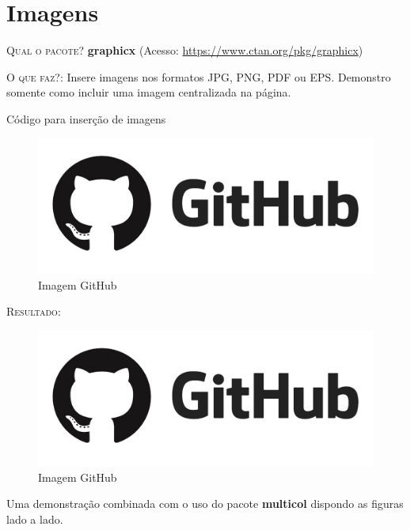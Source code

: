 \documentclass[a4paper,12pt,oneside,openright,extrafontsizes,openbib]{memoir}
\begin{document}
{%
\chapter{Imagens}

\textsc{Qual o pacote?} \textbf{graphicx} (Acesso: \url{https://www.ctan.org/pkg/graphicx})

\textsc{O que faz?}: Insere imagens nos formatos JPG, PNG, PDF ou EPS. Demonstro somente como incluir uma imagem centralizada na página.

\begin{codex}{Código para inserção de imagens}
\begin{figure}[h!]
\begin{center}
\includegraphics[scale=.30]{./img/github.png}
\caption{Imagem GitHub}
\label{fig:github}
\end{center}
\end{figure}
\end{codex}

\textsc{Resultado:}

\begin{figure}[h!]
	\begin{center}
		\includegraphics[scale=.30]{./img/github.png}
		\caption{Imagem GitHub}
		\label{fig:github}
	\end{center}
\end{figure}

Uma demonstração combinada com o uso do pacote \textbf{multicol} dispondo as figuras lado a lado.

}
\end{document}
